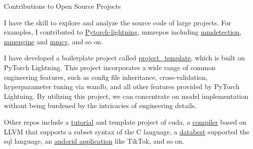 \begin{cventries}
	\cventry
	{} %
	{Contributions to Open Source Projects} %
	{} %
	{} %
	{
		\begin{cvitems} %
			\item{I have the skill to explore and analyze the source code of large projects. For examples, I contributed to \href{https://github.com/Lightning-AI/lightning}{\textcolor{link}{Pytorch-lightning}}, mmrepos including \href{https://github.com/open-mmlab/mmdetection}{\textcolor{link}{mmdetection}}, \href{https://github.com/open-mmlab/mmengine}{\textcolor{link}{mmengine}} and \href{https://github.com/open-mmlab/mmcv}{\textcolor{link}{mmcv}}, and so on.}
			\item{I have developed a boilerplate project called \href{https://github.com/shenmishajing/project_template}{\textcolor{link}{project\_template}}, which is built on PyTorch Lightning. This project incorporates a wide range of common engineering features, such as config file inheritance, cross-validation, hyperparameter tuning via wandb, and all other features provided by PyTorch Lightning. By utilizing this project, we can concentrate on model implementation without being burdened by the intricacies of engineering details.}
			\item{Other repos include a \href{https://github.com/shenmishajing/pytorch_extension_example}{\textcolor{link}{tutorial}} and template project of cuda, a \href{https://github.com/wuzehua/Compiler}{\textcolor{link}{compiler}} based on LLVM that supports a subset syntax of the C language, a \href{https://github.com/shenmishajing/minisql}{\textcolor{link}{databest}} supported the sql language, an \href{https://github.com/wuzehua/MiniTikTok}{\textcolor{link}{andorid application}} like TikTok, and so on.}
		\end{cvitems}
	}
\end{cventries}

